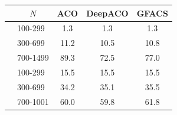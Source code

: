 \begin{tabular}{clccc}
\midrule
& \multicolumn{1}{c}{$N$} & ACO & DeepACO & GFACS \\
\midrule
\parbox[t]{2mm}{} & 100-299 & 1.3 & 1.3 & 1.3 \\
& 300-699 & 11.2 & 10.5 & 10.8 \\
& 700-1499 & 89.3 & 72.5 & 77.0 \\
\midrule
\parbox[t]{2mm}{} & 100-299 & 15.5 & 15.5 & 15.5 \\
& 300-699 & 34.2 & 35.1 & 35.5 \\
& 700-1001 & 60.0 & 59.8 & 61.8 \\

\bottomrule
\end{tabular}
